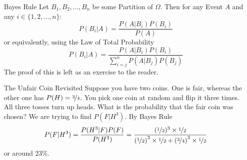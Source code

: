 \documentclass{report}
\begin{document}
\begin{theorem}{Bayes Rule}
    Let $B_1,B_2,...,B_n$ be some Partition of $\Omega$. Then for any Event $A$ and any $i\in \{1,2,...,n\}$:
    \[
        P(B_i\vert A) = \frac{P(A\vert B_i)P(B_i)}{P(A)}
    \]
    or equivalently, using the Law of Total Probability
    \[
        P(B_i\vert A) = \frac{P(A\vert B_i)P(B_i)}{\sum_{i=j}^n P(A|B_j)P(B_j)}
    \]
    \tcblower
    The proof of this is left as an exercise to the reader. 
\end{theorem}

\begin{example}{The Unfair Coin Revisited}
    Suppose you have two coins. One is fair, whereas the other one has $P(H)=\nicefrac 34$. You pick one coin at random and flip it three times. All three tosses turn up heads. What is the probability that the fair coin was chosen?
\tcblower
    We are trying to find $P(F|H^3)$. By Bayes Rule
    \[
        P(F | H^3) = \frac {P(H^3| F)P(F)}{P(H^3)} = \frac{(\nicefrac 12)^3\times \nicefrac 12}{\left(\nicefrac 12\right)^3\times \nicefrac 12 + \left(\nicefrac 34\right)^3\times\nicefrac 12}
    \]
    or around $23\%$.
\end{example}
\end{document}
